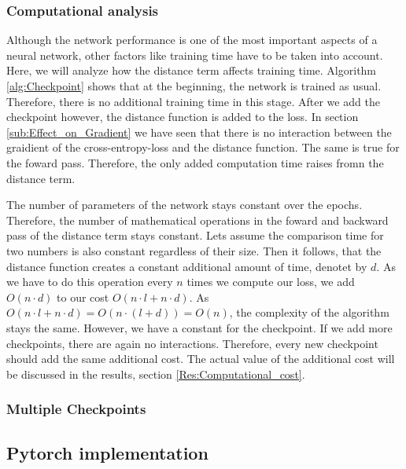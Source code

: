 \subsubsection{Computational analysis}
Although the network performance is one of the most important aspects of a
neural network, other factors like training time have to be taken into account.
Here, we will analyze how the distance term affects training time. Algorithm
\ref{alg:Checkpoint} shows that at the beginning, the network is trained as
usual. Therefore, there is no additional training time in this stage. After we
add the checkpoint however, the distance function is added to the loss. In
section \ref{sub:Effect_on_Gradient} we have seen that there is no interaction
between the graidient of the cross-entropy-loss and the distance function. The
same is true for the foward pass. Therefore, the only added computation time
raises fromn the distance term.

The number of parameters of the network stays constant over the epochs.
Therefore, the number of mathematical operations in the foward and backward pass
of the distance term stays constant. Lets assume the comparison time for two
numbers is also constant regardless of their size. Then it follows, that the
distance function creates a constant additional amount of time, denotet by $d$.
As we have to do this operation every $n$ times we compute our loss, we add
$O(n\cdot d)$ to our cost $O(n\cdot l + n \cdot d)$. As $O(n\cdot l + n \cdot
d)=O(n\cdot (l + d))=O(n)$, the complexity of the algorithm stays the same.
However, we have a constant for the checkpoint. If we add more checkpoints,
there are again no interactions. Therefore, every new checkpoint should add the
same additional cost. The actual value of the additional cost will be discussed
in the results, section \ref{Res:Computational_cost}.





\subsubsection{Multiple Checkpoints}\label{sub:Multiple_checkpoints}

\subsection{Pytorch implementation}

